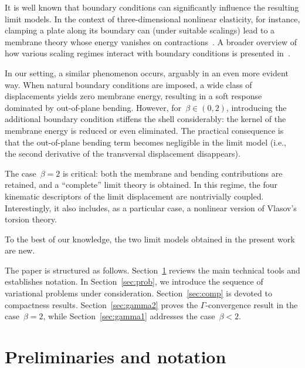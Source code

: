 \documentclass[a4, 11pt, reqno, final]{amsart}
\theoremstyle{plain}%
\begin{document}
	It is well known that boundary conditions can significantly influence the resulting limit models. In the context of three-dimensional nonlinear elasticity, for instance, clamping a plate along its boundary can (under suitable scalings) lead to a membrane theory whose energy vanishes on contractions~\cite{Conti2005}. A broader overview of how various scaling regimes interact with boundary conditions is presented in~\cite{Friesecke2006}.

	In our setting, a similar phenomenon occurs, arguably in an even more evident way. When natural boundary conditions are imposed, a wide class of displacements yields zero membrane energy, resulting in a soft response dominated by out-of-plane bending. However, for~$\beta \in (0,2)$, introducing the additional boundary condition stiffens the shell considerably: the kernel of the membrane energy is reduced or even eliminated. The practical consequence is that the out-of-plane bending term becomes negligible in the limit model (i.e., the second derivative of the transversal displacement disappears).

	The case~$\beta = 2$ is critical: both the membrane and bending contributions are retained, and a ``complete'' limit theory is obtained. In this regime, the four kinematic descriptors of the limit displacement are nontrivially coupled. Interestingly, it also includes, as a particular case, a nonlinear version of Vlasov’s torsion theory.

	To the best of our knowledge, the two limit models obtained in the present work are new.

	The paper is structured as follows. Section~\ref{sec:prel} reviews the main technical tools and establishes notation. In Section~\ref{sec:prob}, we introduce the sequence of variational problems under consideration. Section~\ref{sec:comp} is devoted to compactness results. Section~\ref{sec:gamma2} proves the $\Gamma$-convergence result in the case~$\beta = 2$, while Section~\ref{sec:gamma1} addresses the case~$\beta < 2$.


	\section{Preliminaries and notation}\label{sec:prel}
\end{document}
